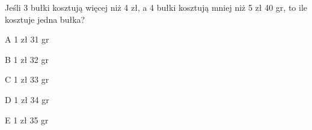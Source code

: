 \begin{tresc}
Jeśli 3 bułki kosztują więcej niż 4 zł, a 4 bułki kosztują mniej niż 5 zł 40 gr, to ile kosztuje jedna bułka?
\end{tresc}
\begin{wariant}{A} 1 zł 31 gr \end{wariant}
\begin{wariant}{B} 1 zł 32 gr \end{wariant}
\begin{wariant}{C} 1 zł 33 gr \end{wariant}
\begin{wariant}{D} 1 zł 34 gr \end{wariant}
\begin{wariant}{E} 1 zł 35 gr \end{wariant}

